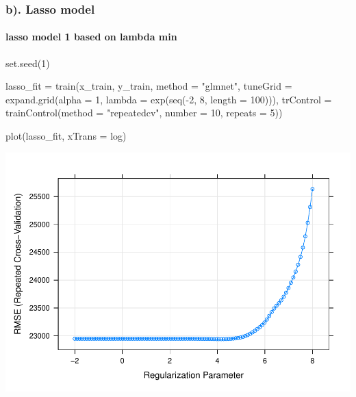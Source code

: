 \documentclass[
]{article}
\newenvironment{Shaded}{\begin{snugshade}}{\end{snugshade}}
\newcommand{\AttributeTok}[1]{\textcolor[rgb]{0.77,0.63,0.00}{#1}}
\newcommand{\DecValTok}[1]{\textcolor[rgb]{0.00,0.00,0.81}{#1}}
\newcommand{\FunctionTok}[1]{\textcolor[rgb]{0.00,0.00,0.00}{#1}}
\newcommand{\NormalTok}[1]{#1}
\newcommand{\OtherTok}[1]{\textcolor[rgb]{0.56,0.35,0.01}{#1}}
\newcommand{\SpecialCharTok}[1]{\textcolor[rgb]{0.00,0.00,0.00}{#1}}
\newcommand{\StringTok}[1]{\textcolor[rgb]{0.31,0.60,0.02}{#1}}
\begin{document}
\hypertarget{b.-lasso-model}{%
\subsubsection{b). Lasso model}\label{b.-lasso-model}}

\hypertarget{lasso-model-1-based-on-lambda-min}{%
\paragraph{lasso model 1 based on lambda
min}\label{lasso-model-1-based-on-lambda-min}}

\begin{Shaded}
\begin{Highlighting}[]
\FunctionTok{set.seed}\NormalTok{(}\DecValTok{1}\NormalTok{)}

\NormalTok{lasso\_fit }\OtherTok{=} \FunctionTok{train}\NormalTok{(x\_train, y\_train, }
                    \AttributeTok{method =} \StringTok{"glmnet"}\NormalTok{,}
                    \AttributeTok{tuneGrid =} \FunctionTok{expand.grid}\NormalTok{(}\AttributeTok{alpha =} \DecValTok{1}\NormalTok{,}
                                           \AttributeTok{lambda =} \FunctionTok{exp}\NormalTok{(}\FunctionTok{seq}\NormalTok{(}\SpecialCharTok{{-}}\DecValTok{2}\NormalTok{, }\DecValTok{8}\NormalTok{, }\AttributeTok{length =} \DecValTok{100}\NormalTok{))),}
                    \AttributeTok{trControl =} \FunctionTok{trainControl}\NormalTok{(}\AttributeTok{method =} \StringTok{"repeatedcv"}\NormalTok{, }\AttributeTok{number =} \DecValTok{10}\NormalTok{, }\AttributeTok{repeats =} \DecValTok{5}\NormalTok{))}

\FunctionTok{plot}\NormalTok{(lasso\_fit, }\AttributeTok{xTrans =}\NormalTok{ log)}
\end{Highlighting}
\end{Shaded}

\includegraphics{p8106_hw1_qz2266_final_files/figure-latex/unnamed-chunk-3-1.pdf}
\end{document}

